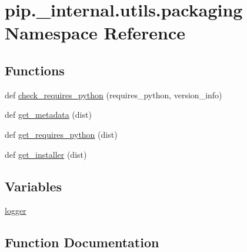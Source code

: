 \hypertarget{namespacepip_1_1__internal_1_1utils_1_1packaging}{}\section{pip.\+\_\+internal.\+utils.\+packaging Namespace Reference}
\label{namespacepip_1_1__internal_1_1utils_1_1packaging}
\subsection*{Functions}
\begin{DoxyCompactItemize}
\item 
def \hyperlink{namespacepip_1_1__internal_1_1utils_1_1packaging_a4fdb0a72887d32af7942a40f3f372e18}{check\+\_\+requires\+\_\+python} (requires\+\_\+python, version\+\_\+info)
\item 
def \hyperlink{namespacepip_1_1__internal_1_1utils_1_1packaging_a754fee3ac3294fe313b4870d848c2e8b}{get\+\_\+metadata} (dist)
\item 
def \hyperlink{namespacepip_1_1__internal_1_1utils_1_1packaging_a9a1a1b346a43ddd0501923f548359c86}{get\+\_\+requires\+\_\+python} (dist)
\item 
def \hyperlink{namespacepip_1_1__internal_1_1utils_1_1packaging_a3017a27d4117f36c01dde2362bcd3316}{get\+\_\+installer} (dist)
\end{DoxyCompactItemize}
\subsection*{Variables}
\begin{DoxyCompactItemize}
\item 
\hyperlink{namespacepip_1_1__internal_1_1utils_1_1packaging_aeeaf45933f76591f1a386645f06bff17}{logger}
\end{DoxyCompactItemize}


\subsection{Function Documentation}
\mbox{\label{namespacepip_1_1__internal_1_1utils_1_1packaging_a4fdb0a72887d32af7942a40f3f372e18}} 
